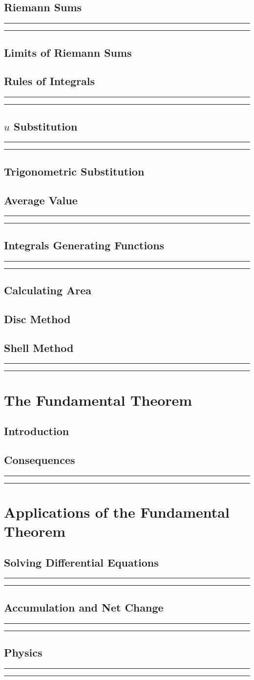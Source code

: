 \documentclass{article}
\newcommand{\newMidline}
{
	\noindent
	\rule{\textwidth}{.5pt}
}
\newcommand{\newchapter}[2]
{
	\subsection{#1}\vspace{.25in}\newMidline\newMidline\vspace{.125in}
}
\begin{document}
\subsection{Riemann Sums}\newMidline\newMidline
\subsection{Limits of Riemann Sums}
\newchapter{Rules of Integrals}{RulesOfIntegrals}
\newchapter{$u$ Substitution}{uSub}
\subsection{Trigonometric Substitution}
\newchapter{Average Value}{AverageValue}
\newchapter{Integrals Generating Functions}{IntegralsGeneratingFunctions}
\subsection{Calculating Area}
\subsection{Disc Method}
\newpage\newchapter{Shell Method}{WasherMethod}
\newpage
\section{The Fundamental Theorem}
\subsection{Introduction}
\newchapter{Consequences}{FundamentalTheoremConsequences}
\newpage
\section{Applications of the Fundamental Theorem}
\newchapter{Solving Differential Equations}{SolvingDifferentialEquations}
\newchapter{Accumulation and Net Change}{AccumulationAndNetChange}
\newchapter{Physics}{SolvingPhysicsWithFundamentalTheorem}
\vfill
\newpage
{}\newpage
\end{document}
